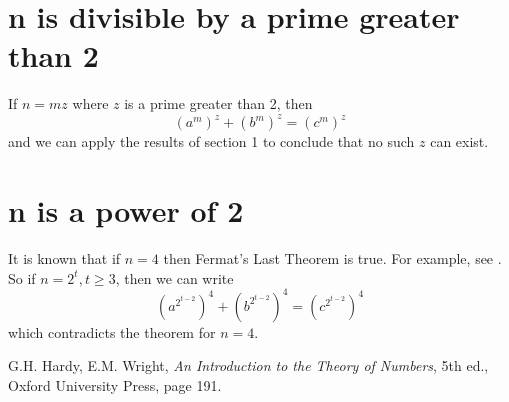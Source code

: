 \documentclass[12pt]{article}
\begin{document}
\section{n is divisible by a prime greater than 2}
If $n = mz$ where $z$ is a prime greater than 2, then
$$
(a^m)^z + (b^m)^z = (c^m)^z
$$ 
and we can apply the results of section 1 to conclude that no such $z$ can exist. 


\section{n is a power of 2}

It is known that if $n=4$ then Fermat's Last Theorem is true. For example,
see \cite{HW}. So if $n=2^t, t\ge 3$, then we can write
$$
(a^{2^{t-2}})^4 + (b^{2^{t-2}})^4 = (c^{2^{t-2}})^4
$$
which contradicts the theorem for $n=4$. 

\begin{thebibliography}{1}
 G.H. Hardy, E.M. Wright, \emph{An Introduction to the Theory of Numbers}, 5th ed., Oxford
University Press, page 191. 
\end{thebibliography}
 
\end{document}
